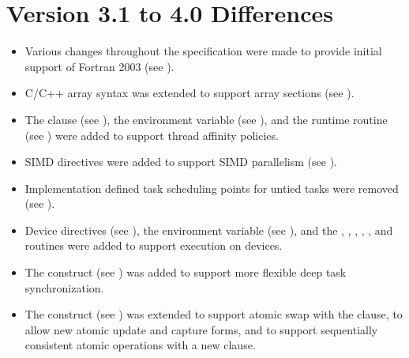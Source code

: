 \section{Version 3.1 to 4.0 Differences}
\label{sec:Version 3.1 to 4.0 Differences}
\begin{itemize}
\item Various changes throughout the specification were made to provide initial 
      support of Fortran 2003 (see ).

\item C/C++ array syntax was extended to support array sections 
      (see ).

\item The  clause 
      (see ), the 
       environment variable (see ), 
      and the  runtime routine 
      (see ) were added to support thread
      affinity policies.

\item SIMD directives were added to support SIMD parallelism 
      (see ).

\item Implementation defined task scheduling points for untied tasks were 
      removed (see ).

\item Device directives (see ), the 
       environment variable 
      (see ), and the ,
      , , 
      , , and 
       routines were added to support execution 
      on devices.

\item The  construct (see ) 
      was added to support more flexible deep task synchronization.

\item The  construct (see ) was 
      extended to support atomic swap with the  clause, to allow 
      new atomic update and capture forms, and to support sequentially consistent 
      atomic operations with a new  clause.


\end{itemize}
